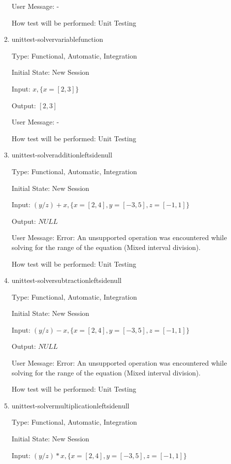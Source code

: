 \documentclass[12pt, titlepage]{article}
\begin{document}
\begin{enumerate}
	User Message: -
	
	How test will be performed: Unit Testing\\
	
	\item{unittest-solvervariablefunction}
	
	Type: Functional, Automatic, Integration
	
	Initial State: New Session
	
	Input: $x, \{ x = [2,3] \}$
	
	Output: $[2,3]$
	
	User Message: -
	
	How test will be performed: Unit Testing\\
	
	\item{unittest-solveradditionleftsidenull}
	
	Type: Functional, Automatic, Integration
	
	Initial State: New Session
	
	Input: $(y/z) + x, \{ x = [2,4], y = [-3,5], z = [-1,1] \}$
	
	Output: $NULL$
	
	User Message: Error: An unsupported operation was encountered while solving 
	for the range of the equation (Mixed interval division).
	
	How test will be performed: Unit Testing\\
	
	\item{unittest-solversubtractionleftsidenull}
	
	Type: Functional, Automatic, Integration
	
	Initial State: New Session
	
	Input: $(y/z) - x, \{ x = [2,4], y = [-3,5], z = [-1,1] \}$
	
	Output: $NULL$
	
	User Message: Error: An unsupported operation was encountered while solving 
	for the range of the equation (Mixed interval division).
	
	How test will be performed: Unit Testing\\
	
	\item{unittest-solvermultiplicationleftsidenull}
	
	Type: Functional, Automatic, Integration
	
	Initial State: New Session
	
	Input: $(y/z) * x, \{ x = [2,4], y = [-3,5], z = [-1,1] \}$
	

\end{enumerate}
\end{document}
